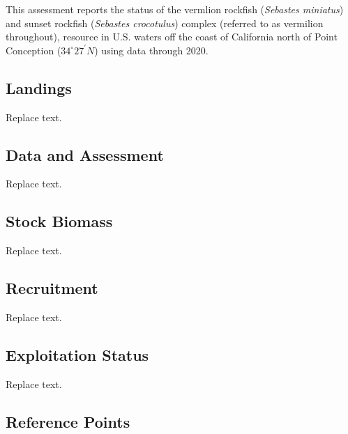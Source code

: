 \documentclass[
  english,
  a4paper,
]{article}
\begin{document}
This assessment reports the status of the vermlion rockfish (\emph{Sebastes miniatus})
and sunset rockfish (\emph{Sebastes crocotulus}) complex (referred to as vermilion
throughout), resource in U.S. waters off the coast of California north
of Point Conception ($34^\circ 27^\prime N$) using data
through 2020.

\hypertarget{landings}{%
\subsection*{Landings}\label{landings}}

Replace text.

\hypertarget{data-and-assessment}{%
\subsection*{Data and Assessment}\label{data-and-assessment}}

Replace text.

\hypertarget{stock-biomass}{%
\subsection*{Stock Biomass}\label{stock-biomass}}

Replace text.

\hypertarget{recruitment}{%
\subsection*{Recruitment}\label{recruitment}}

Replace text.

\hypertarget{exploitation-status}{%
\subsection*{Exploitation Status}\label{exploitation-status}}

Replace text.

\hypertarget{reference-points}{%
\subsection*{Reference Points}\label{reference-points}}
\end{document}
